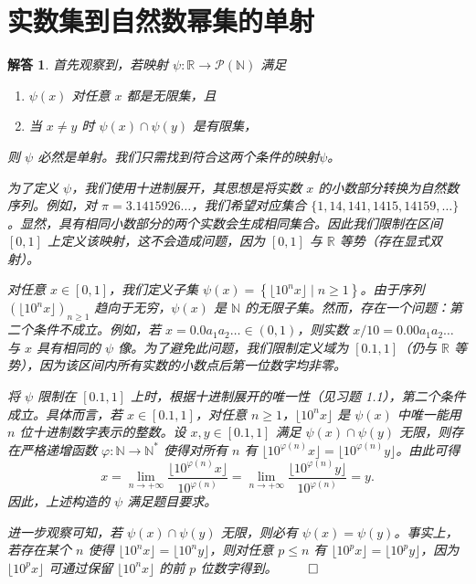 \documentclass[12pt,UTF8,fontset=none]{ctexbook}
\theoremstyle{exercisestyle}
\theoremstyle{solutionstyle}
\newtheorem*{solution*}{解答}
\newenvironment{solution}
  {\begin{solution*}}
  {\hfill\ensuremath{\qed}\end{solution*}}
\begin{document}
\section{实数集到自然数幂集的单射}
\begin{solution}
首先观察到，若映射 $\psi : \mathbb{R} \to \mathcal{P}(\mathbb{N})$ 满足 
\begin{enumerate}[label=\arabic*.]
    \item $\psi(x)$ 对任意 $x$ 都是无限集，且
    \item 当 $x \neq y$ 时 $\psi(x) \cap \psi(y)$ 是有限集，
\end{enumerate}
则 $\psi$ 必然是单射。我们只需找到符合这两个条件的映射$\psi$。

为了定义 $\psi$，我们使用十进制展开，其思想是将实数 $x$ 的小数部分转换为自然数序列。例如，对 $\pi = 3.1415926\ldots$，我们希望对应集合 $\{1, 14, 141, 1415, 14159, \ldots\}$。显然，具有相同小数部分的两个实数会生成相同集合。因此我们限制在区间 $[0, 1]$ 上定义该映射，这不会造成问题，因为 $[0,1]$ 与 $\mathbb{R}$ 等势（存在显式双射）。

对任意 $x \in [0,1]$，我们定义子集 $\psi(x) = \left\{ \lfloor10^n x\rfloor \mid n \geq 1 \right\}$。由于序列 $(\lfloor10^n x\rfloor)_{n \geq 1}$ 趋向于无穷，$\psi(x)$ 是 $\mathbb{N}$ 的无限子集。然而，存在一个问题：第二个条件不成立。例如，若 $x = 0.0a_1a_2\ldots \in (0,1)$，则实数 $x/10 = 0.00a_1a_2\ldots$ 与 $x$ 具有相同的 $\psi$ 像。为了避免此问题，我们限制定义域为 $[0.1, 1]$（仍与 $\mathbb{R}$ 等势），因为该区间内所有实数的小数点后第一位数字均非零。

将 $\psi$ 限制在 $[0.1, 1]$ 上时，根据十进制展开的唯一性（见习题 1.1），第二个条件成立。具体而言，若 $x \in [0.1, 1]$，对任意 $n \geq 1$，$\lfloor10^n x\rfloor$ 是 $\psi(x)$ 中唯一能用 $n$ 位十进制数字表示的整数。设 $x, y \in [0.1, 1]$ 满足 $\psi(x) \cap \psi(y)$ 无限，则存在严格递增函数 $\varphi : \mathbb{N} \to \mathbb{N}^*$ 使得对所有 $n$ 有 $\lfloor10^{\varphi(n)}x\rfloor = \lfloor10^{\varphi(n)}y\rfloor$。由此可得
$$
x = \lim_{n \to +\infty} \frac{\lfloor10^{\varphi(n)}x\rfloor}{10^{\varphi(n)}} = \lim_{n \to +\infty} \frac{\lfloor10^{\varphi(n)}y\rfloor}{10^{\varphi(n)}} = y.
$$
因此，上述构造的 $\psi$ 满足题目要求。

进一步观察可知，若 $\psi(x) \cap \psi(y)$ 无限，则必有 $\psi(x) = \psi(y)$。事实上，若存在某个 $n$ 使得 $\lfloor10^n x\rfloor = \lfloor10^n y\rfloor$，则对任意 $p \leq n$ 有 $\lfloor10^p x\rfloor = \lfloor10^p y\rfloor$，因为 $\lfloor10^p x\rfloor$ 可通过保留 $\lfloor10^n x\rfloor$ 的前 $p$ 位数字得到。
\end{solution}
\end{document}
